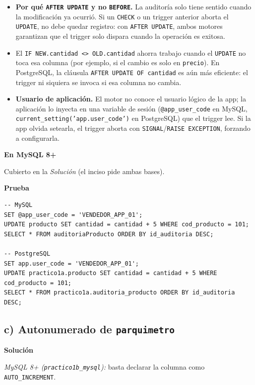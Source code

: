 \documentclass[11pt,a4paper]{article}
\newcommand{\itemcabecera}[1]{\noindent\textbf{#1}\par\medskip}
\newcommand{\bloqueSolucion}{\itemcabecera{Soluci\'on}}
\newcommand{\bloqueMySQL}{\itemcabecera{En MySQL 8+}}
\newcommand{\bloquePrueba}{\itemcabecera{Prueba}}
\begin{document}
\begin{itemize}
    \item \textbf{Por qué \texttt{AFTER UPDATE} y no \texttt{BEFORE}.} La auditoría solo tiene sentido cuando la modificación ya ocurrió. Si un \texttt{CHECK} o un trigger anterior aborta el \texttt{UPDATE}, no debe quedar registro: con \texttt{AFTER UPDATE}, ambos motores garantizan que el trigger solo dispara cuando la operación es exitosa.
    \item El \texttt{IF NEW.cantidad <> OLD.cantidad} ahorra trabajo cuando el \texttt{UPDATE} no toca esa columna (por ejemplo, si el cambio es solo en \texttt{precio}). En PostgreSQL, la cláusula \texttt{AFTER UPDATE OF cantidad} es aún más eficiente: el trigger ni siquiera se invoca si esa columna no cambia.
    \item \textbf{Usuario de aplicación.} El motor no conoce el usuario lógico de la app; la aplicación lo inyecta en una variable de sesión (\texttt{@app\_user\_code} en MySQL, \texttt{current\_setting('app.user\_code')} en PostgreSQL) que el trigger lee. Si la app olvida setearla, el trigger aborta con \texttt{SIGNAL}/\texttt{RAISE EXCEPTION}, forzando a configurarla.
\end{itemize}

\bloqueMySQL

Cubierto en la \textit{Solución} (el inciso pide ambas bases).

\bloquePrueba

\begin{lstlisting}
-- MySQL
SET @app_user_code = 'VENDEDOR_APP_01';
UPDATE producto SET cantidad = cantidad + 5 WHERE cod_producto = 101;
SELECT * FROM auditoriaProducto ORDER BY id_auditoria DESC;

-- PostgreSQL
SET app.user_code = 'VENDEDOR_APP_01';
UPDATE practico1a.producto SET cantidad = cantidad + 5 WHERE cod_producto = 101;
SELECT * FROM practico1a.auditoria_producto ORDER BY id_auditoria DESC;
\end{lstlisting}

\subsection{c) Autonumerado de \texttt{parquimetro}}

\bloqueSolucion

\textit{MySQL 8+ (\texttt{practico1b\_mysql}):} basta declarar la columna como \texttt{AUTO\_INCREMENT}.
\end{document}
